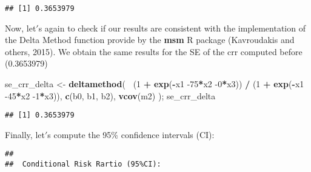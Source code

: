 \documentclass[
]{article}
\newenvironment{Shaded}{\begin{snugshade}}{\end{snugshade}}
\newcommand{\CharTok}[1]{\textcolor[rgb]{0.31,0.60,0.02}{#1}}
\newcommand{\DecValTok}[1]{\textcolor[rgb]{0.00,0.00,0.81}{#1}}
\newcommand{\FloatTok}[1]{\textcolor[rgb]{0.00,0.00,0.81}{#1}}
\newcommand{\KeywordTok}[1]{\textcolor[rgb]{0.13,0.29,0.53}{\textbf{#1}}}
\newcommand{\NormalTok}[1]{#1}
\newcommand{\OperatorTok}[1]{\textcolor[rgb]{0.81,0.36,0.00}{\textbf{#1}}}
\newcommand{\StringTok}[1]{\textcolor[rgb]{0.31,0.60,0.02}{#1}}
\begin{document}
\begin{verbatim}
## [1] 0.3653979
\end{verbatim}

Now, let\('\)s again to check if our results are consistent with the
implementation of the Delta Method function provide by the \textbf{msm}
R package (Kavroudakis and others, 2015). We obtain the same results for
the SE of the crr computed before (0.3653979)

\begin{Shaded}
\begin{Highlighting}[]
\NormalTok{se_crr_delta <-}\StringTok{ }\KeywordTok{deltamethod}\NormalTok{( }\OperatorTok{~}\NormalTok{(}\DecValTok{1} \OperatorTok{+}\StringTok{ }\KeywordTok{exp}\NormalTok{(}\OperatorTok{-}\NormalTok{x1 }\DecValTok{-75}\OperatorTok{*}\NormalTok{x2 }\DecValTok{-0}\OperatorTok{*}\NormalTok{x3)) }\OperatorTok{/}\StringTok{ }\NormalTok{(}\DecValTok{1} \OperatorTok{+}\StringTok{ }\KeywordTok{exp}\NormalTok{(}\OperatorTok{-}\NormalTok{x1 }\DecValTok{-45}\OperatorTok{*}\NormalTok{x2 }\DecValTok{-1}\OperatorTok{*}\NormalTok{x3)), }
             \KeywordTok{c}\NormalTok{(b0, b1, b2), }
             \KeywordTok{vcov}\NormalTok{(m2)}
\NormalTok{             ); se_crr_delta}
\end{Highlighting}
\end{Shaded}

\begin{verbatim}
## [1] 0.3653979
\end{verbatim}

Finally, let\('\)s compute the 95\% confidence intervals (CI):

\begin{Shaded}
\end{Shaded}

\begin{verbatim}
## 
##  Conditional Risk Rartio (95%CI):
\end{verbatim}
\end{document}
